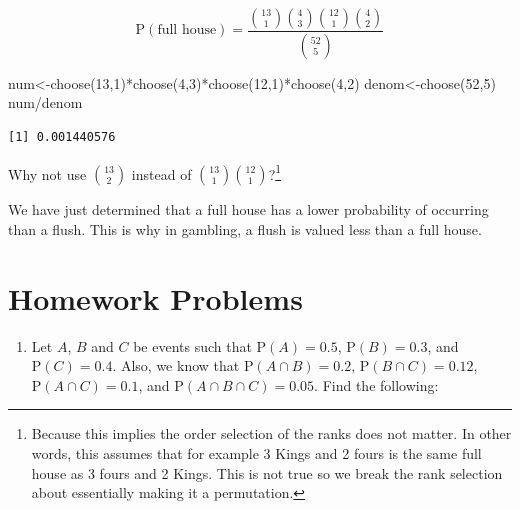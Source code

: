 \documentclass[
  letterpaper,
  DIV=11,
  numbers=noendperiod]{scrreprt}
\newenvironment{Shaded}{\begin{snugshade}}{\end{snugshade}}
\newcommand{\DecValTok}[1]{\textcolor[rgb]{0.68,0.00,0.00}{#1}}
\newcommand{\FunctionTok}[1]{\textcolor[rgb]{0.28,0.35,0.67}{#1}}
\newcommand{\NormalTok}[1]{\textcolor[rgb]{0.00,0.23,0.31}{#1}}
\newcommand{\OtherTok}[1]{\textcolor[rgb]{0.00,0.23,0.31}{#1}}
\newcommand{\SpecialCharTok}[1]{\textcolor[rgb]{0.37,0.37,0.37}{#1}}
\providecommand{\tightlist}{%
  \setlength{\itemsep}{0pt}\setlength{\parskip}{0pt}}\usepackage{longtable,booktabs,array}
\begin{document}
\[
\mbox{P}(\mbox{full house})=\frac{\binom{13}{1}\binom{4}{3}\binom{12}{1}\binom{4}{2}}{\binom{52}{5}}
\]

\begin{Shaded}
\begin{Highlighting}[]
\NormalTok{num}\OtherTok{\textless{}{-}}\FunctionTok{choose}\NormalTok{(}\DecValTok{13}\NormalTok{,}\DecValTok{1}\NormalTok{)}\SpecialCharTok{*}\FunctionTok{choose}\NormalTok{(}\DecValTok{4}\NormalTok{,}\DecValTok{3}\NormalTok{)}\SpecialCharTok{*}\FunctionTok{choose}\NormalTok{(}\DecValTok{12}\NormalTok{,}\DecValTok{1}\NormalTok{)}\SpecialCharTok{*}\FunctionTok{choose}\NormalTok{(}\DecValTok{4}\NormalTok{,}\DecValTok{2}\NormalTok{)}
\NormalTok{denom}\OtherTok{\textless{}{-}}\FunctionTok{choose}\NormalTok{(}\DecValTok{52}\NormalTok{,}\DecValTok{5}\NormalTok{)}
\NormalTok{num}\SpecialCharTok{/}\NormalTok{denom}
\end{Highlighting}
\end{Shaded}

\begin{verbatim}
[1] 0.001440576
\end{verbatim}

Why not use \(\binom{13}{2}\) instead of
\(\binom{13}{1}\binom{12}{1}\)?\footnote{Because this implies the order
  selection of the ranks does not matter. In other words, this assumes
  that for example 3 Kings and 2 fours is the same full house as 3 fours
  and 2 Kings. This is not true so we break the rank selection about
  essentially making it a permutation.}

We have just determined that a full house has a lower probability of
occurring than a flush. This is why in gambling, a flush is valued less
than a full house.

\section{Homework Problems}\label{homework-problems-7}

\begin{enumerate}
\def\labelenumi{\arabic{enumi}.}
\tightlist
\item
  Let \(A\), \(B\) and \(C\) be events such that \(\mbox{P}(A)=0.5\),
  \(\mbox{P}(B)=0.3\), and \(\mbox{P}(C)=0.4\). Also, we know that
  \(\mbox{P}(A \cap B)=0.2\), \(\mbox{P}(B \cap C)=0.12\),
  \(\mbox{P}(A \cap C)=0.1\), and \(\mbox{P}(A \cap B \cap C)=0.05\).
  Find the following:
\end{enumerate}
\end{document}
